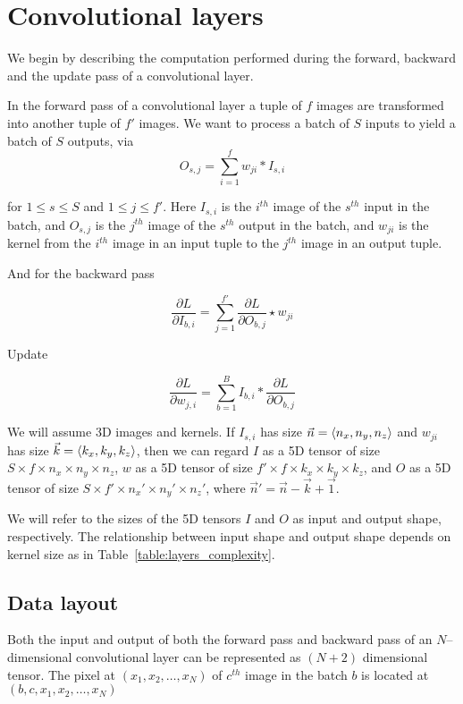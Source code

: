 \section{Convolutional layers}

  We begin by describing the computation performed during the forward,
  backward and the update pass of a convolutional layer.

  In the forward pass of a convolutional layer a tuple of $f$ images
  are transformed into another tuple of $f'$ images.  We want to
  process a batch of $S$ inputs to yield a batch of $S$ outputs, via
  \[
  O_{s,j} = \sum_{i=1}^f w_{ji}\ast I_{s,i}
  \]

  for $1 \le s \le S$ and $1 \le j \le f'$.  Here $I_{s,i}$ is the
  $i^{th}$ image of the $s^{th}$ input in the batch, and $O_{s,j}$ is
  the $j^{th}$ image of the $s^{th}$ output in the batch, and $w_{ji}$
  is the kernel from the $i^{th}$ image in an input tuple to the
  $j^{th}$ image in an output tuple.


  And for the backward pass

  \[
  \frac{\partial L}{\partial I_{b,i}} = \sum_{j=1}^{f'}
  \frac{\partial L}{\partial O_{b,j}} \star w_{ji}
  \]

  Update

  \[
  \frac{\partial L}{\partial w_{j,i}} = \sum_{b=1}^B I_{b,i} \ast
    \frac{\partial L}{\partial O_{b,j}}
  \]

  We will assume 3D images and kernels.  If $I_{s,i}$ has size
  $\vec{n} = \langle n_x, n_y, n_z\rangle$ and $w_{ji}$ has size $\vec{k} =
  \langle k_x,k_y,k_z\rangle$, then we can regard $I$ as a 5D tensor of size
  $S \times f \times n_x \times n_y \times n_z$, $w$ as a 5D tensor of
  size $f' \times f \times k_x \times k_y \times k_z$, and $O$ as a 5D
  tensor of size $S \times f' \times n_x' \times n_y' \times n_z'$,
  where $\vec{n}' = \vec{n} - \vec{k} + \vec{1}$.

  We will refer to the sizes of the 5D tensors $I$ and $O$ as input
  and output shape, respectively.  The relationship between input
  shape and output shape depends on kernel size as in
  Table~\ref{table:layers_complexity}.


\subsection{Data layout}

  Both the input and output of both the forward pass and backward pass
  of an $N$--dimensional convolutional layer can be represented as
  $(N+2)$ dimensional tensor.  The pixel at $(x_1,x_2,\dots,x_N)$ of
  $c^{th}$ image in the batch $b$ is located at
  $(b,c,x_1,x_2,\dots,x_N)$

